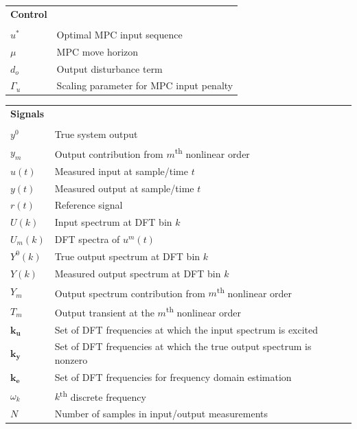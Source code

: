 \documentclass[11pt,twoside]{report}
\begin{document}
\begin{longtable}{p{} p{}}
\textbf{Control} & \null \\ %
\\
$u^*$ & Optimal MPC input sequence \\
$\mu$ & MPC move horizon \\
$d_o$ & Output disturbance term \\
$\Gamma_u$ & Scaling parameter for MPC input penalty 
\end{longtable}
\thispagestyle{plain}

\begin{longtable}{p{} p{}}
\textbf{Signals} & \null \\ %
\\
$y^0$ & True system output \\
$y_m$ & Output contribution from $m$\textsuperscript{th} nonlinear order \\
$u(t)$ & Measured input at sample/time $t$ \\
$y(t)$ & Measured output at sample/time $t$ \\
$r(t)$ & Reference signal \\
$U(k)$ & Input spectrum at DFT bin $k$ \\
$U_m(k)$ & DFT spectra of $u^m(t)$ \\
$Y^0(k)$ & True output spectrum at DFT bin $k$ \\
$Y(k)$ & Measured output spectrum at DFT bin $k$ \\
$Y_m$ & Output spectrum contribution from $m$\textsuperscript{th} nonlinear order \\
$T_m$ & Output transient at the $m$\textsuperscript{th} nonlinear order \\
$\mathbf{k_u}$ & Set of DFT frequencies at which the input spectrum is excited \\
$\mathbf{k_y}$ & Set of DFT frequencies at which the true output spectrum is nonzero \\
$\mathbf{k_e}$ & Set of DFT frequencies for frequency domain estimation \\
$\omega_k$ & $k$\textsuperscript{th} discrete frequency \\
$N$ & Number of samples in input/output measurements 
\end{longtable}
\thispagestyle{plain}
\end{document}
